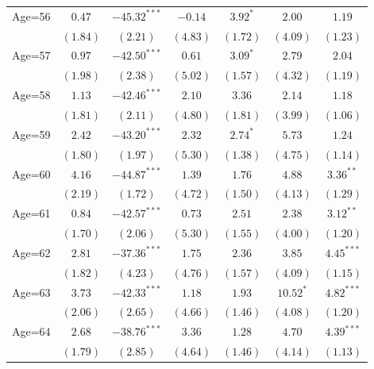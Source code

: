 \documentclass[fullpage]{paper}
\begin{document}
\begin{center}
\begin{longtable}{l c c c c c c }
Age=56      & $0.47$       & $-45.32^{***}$ & $-0.14$       & $3.92^{*}$   & $2.00$        & $1.19$        \\
            & $(1.84)$     & $(2.21)$       & $(4.83)$      & $(1.72)$     & $(4.09)$      & $(1.23)$      \\
Age=57      & $0.97$       & $-42.50^{***}$ & $0.61$        & $3.09^{*}$   & $2.79$        & $2.04$        \\
            & $(1.98)$     & $(2.38)$       & $(5.02)$      & $(1.57)$     & $(4.32)$      & $(1.19)$      \\
Age=58      & $1.13$       & $-42.46^{***}$ & $2.10$        & $3.36$       & $2.14$        & $1.18$        \\
            & $(1.81)$     & $(2.11)$       & $(4.80)$      & $(1.81)$     & $(3.99)$      & $(1.06)$      \\
Age=59      & $2.42$       & $-43.20^{***}$ & $2.32$        & $2.74^{*}$   & $5.73$        & $1.24$        \\
            & $(1.80)$     & $(1.97)$       & $(5.30)$      & $(1.38)$     & $(4.75)$      & $(1.14)$      \\
Age=60      & $4.16$       & $-44.87^{***}$ & $1.39$        & $1.76$       & $4.88$        & $3.36^{**}$   \\
            & $(2.19)$     & $(1.72)$       & $(4.72)$      & $(1.50)$     & $(4.13)$      & $(1.29)$      \\
Age=61      & $0.84$       & $-42.57^{***}$ & $0.73$        & $2.51$       & $2.38$        & $3.12^{**}$   \\
            & $(1.70)$     & $(2.06)$       & $(5.30)$      & $(1.55)$     & $(4.00)$      & $(1.20)$      \\
Age=62      & $2.81$       & $-37.36^{***}$ & $1.75$        & $2.36$       & $3.85$        & $4.45^{***}$  \\
            & $(1.82)$     & $(4.23)$       & $(4.76)$      & $(1.57)$     & $(4.09)$      & $(1.15)$      \\
Age=63      & $3.73$       & $-42.33^{***}$ & $1.18$        & $1.93$       & $10.52^{*}$   & $4.82^{***}$  \\
            & $(2.06)$     & $(2.65)$       & $(4.66)$      & $(1.46)$     & $(4.08)$      & $(1.20)$      \\
Age=64      & $2.68$       & $-38.76^{***}$ & $3.36$        & $1.28$       & $4.70$        & $4.39^{***}$  \\
            & $(1.79)$     & $(2.85)$       & $(4.64)$      & $(1.46)$     & $(4.14)$      & $(1.13)$      \\

\end{longtable}
\end{center}
\end{document}
